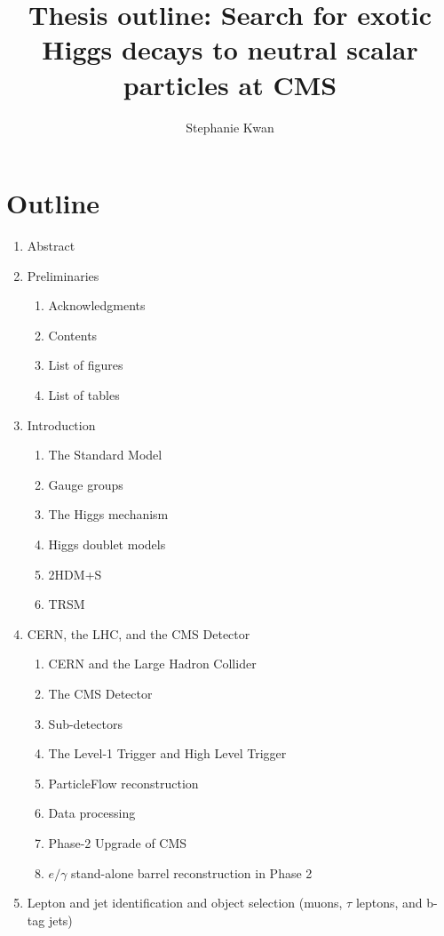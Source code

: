 \documentclass{article}
\title{Thesis outline: Search for exotic Higgs decays to neutral scalar particles at CMS}
\author{Stephanie Kwan}
\begin{document}
\maketitle

\section{Outline}

\begin{enumerate}
    \item Abstract
    \item Preliminaries
        \begin{enumerate}
            \item Acknowledgments
            \item Contents
            \item List of figures
            \item List of tables
        \end{enumerate}
    \item Introduction
        \begin{enumerate}
            \item The Standard Model
            \item Gauge groups
            \item The Higgs mechanism
            \item Higgs doublet models
            \item 2HDM+S 
            \item TRSM
        \end{enumerate}
    \item CERN, the LHC, and the CMS Detector
        \begin{enumerate}
            \item CERN and the Large Hadron Collider
            \item The CMS Detector
            \item Sub-detectors
            \item The Level-1 Trigger and High Level Trigger
            \item ParticleFlow reconstruction
            \item Data processing 
            \item Phase-2 Upgrade of CMS
            \item $e/\gamma$ stand-alone barrel reconstruction in Phase 2
        \end{enumerate}
    \item Lepton and jet identification and object selection (muons, $\tau$ leptons, and b-tag jets)

\end{enumerate}
\end{document}
